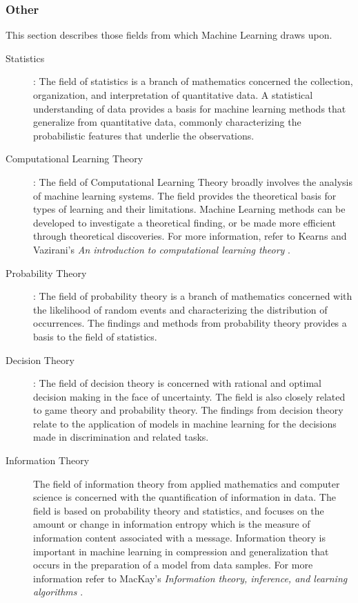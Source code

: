 \documentclass[a4paper, 11pt]{article}
\begin{document}
\subsubsection{Other}
This section describes those fields from which Machine Learning draws upon. 

\begin{description}
	\item[Statistics]: The field of statistics is a branch of mathematics concerned the collection, organization, and interpretation of quantitative data. A statistical understanding of data provides a basis for machine learning methods that generalize from quantitative data, commonly characterizing the probabilistic features that underlie the observations.
	
	\item[Computational Learning Theory]: The field of Computational Learning Theory broadly involves the analysis of machine learning systems. The field provides the theoretical basis for types of learning and their limitations. Machine Learning methods can be developed to investigate a theoretical finding, or be made more efficient through theoretical discoveries. For more information, refer to Kearns and Vazirani's \emph{An introduction to computational learning theory} \cite{Kearns1994}.
	
	\item[Probability Theory]: The field of probability theory is a branch of mathematics concerned with the likelihood of random events and characterizing the distribution of occurrences. The findings and methods from probability theory provides a basis to the field of statistics. 
	
	\item[Decision Theory]: The field of decision theory is concerned with rational and optimal decision making in the face of uncertainty. The field is also closely related to game theory and probability theory. The findings from decision theory relate to the application of models in machine learning for the decisions made in discrimination and related tasks.
	
	\item[Information Theory]	The field of information theory from applied mathematics and computer science is concerned with the quantification of information in data. The field is based on probability theory and statistics, and focuses on the amount or change in information entropy which is the measure of information content associated with a message. Information theory is important in machine learning in compression and generalization that occurs in the preparation of a model from data samples. For more information refer to MacKay's \emph{Information theory, inference, and learning algorithms} \cite{MacKay2003}.
\end{description}
\end{document}
